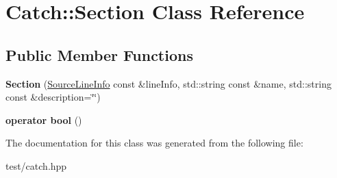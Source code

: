 \hypertarget{classCatch_1_1Section}{}\section{Catch\+:\+:Section Class Reference}
\label{classCatch_1_1Section}
\subsection*{Public Member Functions}
\begin{DoxyCompactItemize}
\item 
{\bfseries Section} (\hyperlink{structCatch_1_1SourceLineInfo}{Source\+Line\+Info} const \&line\+Info, std\+::string const \&name, std\+::string const \&description=\char`\"{}\char`\"{})\hypertarget{classCatch_1_1Section_a198fc28fb53ab34a3fa228503161ad6b}{}\label{classCatch_1_1Section_a198fc28fb53ab34a3fa228503161ad6b}

\item 
{\bfseries operator bool} ()\hypertarget{classCatch_1_1Section_ac9a2be9ed0b2248f8b9c4c06efde4a29}{}\label{classCatch_1_1Section_ac9a2be9ed0b2248f8b9c4c06efde4a29}

\end{DoxyCompactItemize}


The documentation for this class was generated from the following file\+:\begin{DoxyCompactItemize}
\item 
test/catch.\+hpp\end{DoxyCompactItemize}
